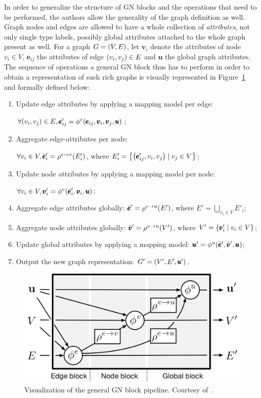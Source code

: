 In order to generalize the structure of GN blocks and the operations that need to be performed, the authors allow the generality of the graph definition as well. Graph nodes and edges are allowed to have a whole collection of \emph{attributes}, not only single type labels, possibly global attributes attached to the whole graph present as well. For a graph $G=\mathopen{}\left(V, E\right)$, let $\pmb{v}_i$ denote the attributes of node $v_i \in V$, $\pmb{e}_{ij}$ the attributes of edge $\mathopen{}\left(v_i,v_j\right)\in E$ and $\pmb{u}$ the global graph attributes. The sequence of operations a general GN block thus has to perform in order to obtain a representation of such rich graphs is visually represented in Figure~\ref{fig:general_gn_block} and formally defined below:
\begin{enumerate}
\item Update edge attributes by applying a mapping model per edge: 

$\forall \mathopen{}\left(v_i, v_j\right) \in E, \pmb{e}'_{ij} = \phi^e\mathopen{}\left(\pmb{e}_{ij},\pmb{v}_i,\pmb{v}_j,\pmb{u}\right)$;
\item Aggregate edge-attributes per node: 

$\forall v_i \in V,\bar{\pmb{e}}'_i = \rho^{e \to v}\mathopen{}\left(E'_i\right)$, where $E'_i = \mathopen{}\left\{\mathopen{}\left(\pmb{e}'_{ij}, v_i, v_j\right) \mid v_j \in V\right\}$;
\item Update node attributes by applying a mapping model per node: 

$\forall v_i \in V, \pmb{v}'_i = \phi^v\mathopen{}\left(\bar{\pmb{e}}'_i, \pmb{v}_i, \pmb{u}\right)$;
\item Aggregate edge attributes globally: $\bar{\pmb{e}}'=\rho^{e \to u}\mathopen{}\left(E'\right)$, where $E' = \bigcup_{v_i \in V}{E'_i}$;
\item Aggregate node attributes globally: $\bar{\pmb{v}}'=\rho^{v \to u}\mathopen{}\left(V'\right)$, where $V' = \mathopen{}\left\{\pmb{v}'_i \mid v_i \in V\right\}$;
\item Update global attributes by applying a mapping model: $\pmb{u}'=\phi^u\mathopen{}\left(\bar{\pmb{e}}', \bar{\pmb{v}}', \pmb{u}\right)$;
\item Output the new graph representation: $G'=\mathopen{}\left(V', E', \pmb{u}'\right)$.
\end{enumerate}

\begin{figure}%
\centering
\includegraphics[width=\textwidth]{figures/background/general_gn_block}
\caption[Visualization of the general GN block pipeline.]{Visualization of the general GN block pipeline. Courtesy of~\cite{battaglia_relational_2018}.}
\label{fig:general_gn_block}
\end{figure}

